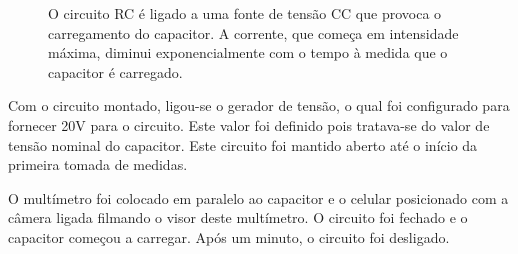 \documentclass[12pt,a4paper]{article}
\begin{document}
\begin{multicols*}{2}
        \begin{figure}[H]
            \centering
            \caption{O circuito RC é ligado a uma fonte de tensão CC que provoca o carregamento do capacitor. A corrente, que começa em intensidade máxima, diminui exponencialmente com o tempo à medida que o capacitor é carregado.}
        \end{figure}
    
    Com o circuito montado, ligou-se o gerador de tensão, o qual foi configurado para fornecer 20V para o circuito. Este valor foi definido pois tratava-se do valor de tensão nominal do capacitor. Este circuito foi mantido aberto até o início da primeira tomada de medidas.
    
    O multímetro foi colocado em paralelo ao capacitor e o celular posicionado com a câmera ligada filmando o visor deste multímetro. O circuito foi fechado e o capacitor começou a carregar. Após um minuto, o circuito foi desligado.
    

\end{multicols*}
\end{document}
